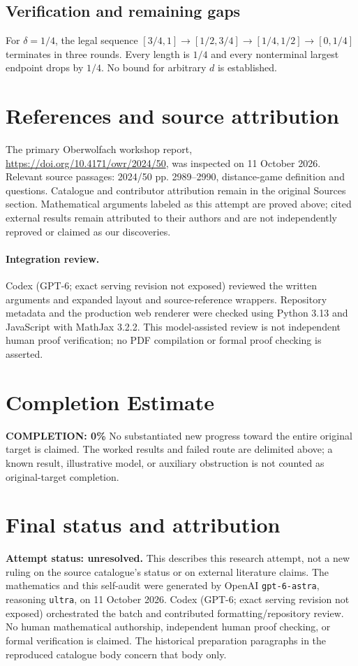 \documentclass[11pt]{article}
\begin{document}
\subsection{Verification and remaining gaps}
For $\delta=1/4$, the legal sequence $[3/4,1]\to[1/2,3/4]\to[1/4,1/2]\to[0,1/4]$ terminates in three rounds. Every length is $1/4$ and every nonterminal largest endpoint drops by $1/4$. No bound for arbitrary $d$ is established.

\section{References and source attribution}
The primary Oberwolfach workshop report, \url{https://doi.org/10.4171/owr/2024/50}, was inspected on 11 October 2026. Relevant source passages: 2024/50 pp. 2989--2990, distance-game definition and questions. Catalogue and contributor attribution remain in the original Sources section. Mathematical arguments labeled as this attempt are proved above; cited external results remain attributed to their authors and are not independently reproved or claimed as our discoveries.


\paragraph{Integration review.} Codex (GPT-6; exact serving revision not exposed) reviewed the written arguments and expanded layout and source-reference wrappers. Repository metadata and the production web renderer were checked using Python 3.13 and JavaScript with MathJax 3.2.2. This model-assisted review is not independent human proof verification; no PDF compilation or formal proof checking is asserted.

\section{Completion Estimate}
\noindent\textbf{COMPLETION: 0\%}
No substantiated new progress toward the entire original target is claimed. The worked results and failed route are delimited above; a known result, illustrative model, or auxiliary obstruction is not counted as original-target completion.

\section{Final status and attribution}
\textbf{Attempt status: unresolved.} This describes this research attempt, not a new ruling on the source catalogue's status or on external literature claims.
The mathematics and this self-audit were generated by OpenAI \texttt{gpt-6-astra}, reasoning \texttt{ultra}, on 11 October 2026. Codex (GPT-6; exact serving revision not exposed) orchestrated the batch and contributed formatting/repository review. No human mathematical authorship, independent human proof checking, or formal verification is claimed. The historical preparation paragraphs in the reproduced catalogue body concern that body only.
\end{document}
